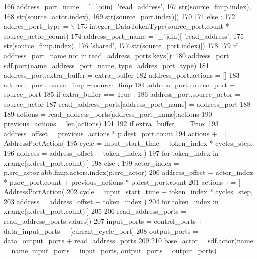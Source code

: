 \begin{DoxyCode}
166         address\_port\_name = \textcolor{stringliteral}{'\_'}.join([ \textcolor{stringliteral}{'read\_address'},
167         str(source\_fimp.index),
168         str(source\_actor.index),
169         str(source\_port.index)])
170 
171       \textcolor{keywordflow}{else} :
172         addres\_port\_type = \(\backslash\)
173         integer\_DataTokenType(source\_port.count * source\_actor\_count)
174         address\_port\_name = \textcolor{stringliteral}{'\_'}.join([ \textcolor{stringliteral}{'read\_address'},
175         str(source\_fimp.index),
176         \textcolor{stringliteral}{'shared'},
177         str(source\_port.index)])
178 
179       \textcolor{keywordflow}{if} address\_port\_name \textcolor{keywordflow}{not} \textcolor{keywordflow}{in} read\_address\_ports.keys():
180         address\_port = sdf.port(name=address\_port\_name, type=addres\_port\_type)
181         address\_port.extra\_buffer = extra\_buffer
182         address\_port.actions = []
183         address\_port.source\_fimp = source\_fimp
184         address\_port.source\_port = source\_port
185         \textcolor{keywordflow}{if} extra\_buffer == \textcolor{keyword}{True} :
186           address\_port.source\_actor = source\_actor
187         read\_address\_ports[address\_port\_name] = address\_port
188 
189       actions = read\_address\_ports[address\_port\_name].actions
190       previous\_actions = len(actions)
191 
192       \textcolor{keywordflow}{if} extra\_buffer == \textcolor{keyword}{True}:
193         address\_offset = previous\_actions * p.dest\_port.count
194         actions += [ AddressPortAction(
195           cycle = input\_start\_time + token\_index * cycles\_step,
196           address = address\_offset + token\_index )
197           \textcolor{keywordflow}{for} token\_index \textcolor{keywordflow}{in} xrange(p.dest\_port.count) ]
198       \textcolor{keywordflow}{else} :
199         actor\_index = p.src\_actor.abb.fimp.actors.index(p.src\_actor)
200         address\_offset = actor\_index * p.src\_port.count + previous\_actions * p.dest\_port.count
201         actions += [ AddressPortAction(
202           cycle = input\_start\_time + token\_index * cycles\_step,
203           address = address\_offset + token\_index )
204           \textcolor{keywordflow}{for} token\_index \textcolor{keywordflow}{in} xrange(p.dest\_port.count) ]
205 
206   read\_address\_ports = read\_address\_ports.values()
207   input\_ports = control\_ports + data\_input\_ports + [current\_cycle\_port]
208   output\_ports = data\_output\_ports + read\_address\_ports
209 
210   base\_actor = sdf.actor(name = name, input\_ports = input\_ports, output\_ports = output\_ports)

\end{DoxyCode}
